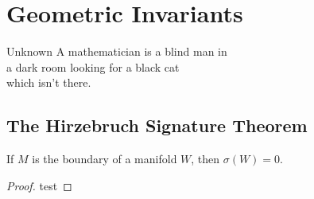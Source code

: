\chapter{Geometric Invariants}\label{chap:invariants}

\begin{epigraph}{15em}{Unknown}
	A mathematician is a blind man in \\
	a dark room looking for a black cat \\
	which isn’t there.
\end{epigraph}



\section{The Hirzebruch Signature Theorem}\label{sec:hirzebruch-signature-theorem}

\begin{proposition}
	If $M$ is the boundary of a manifold $W$, then $\sigma(W)=0$.
\end{proposition}
\begin{proof}
	test
\end{proof}

